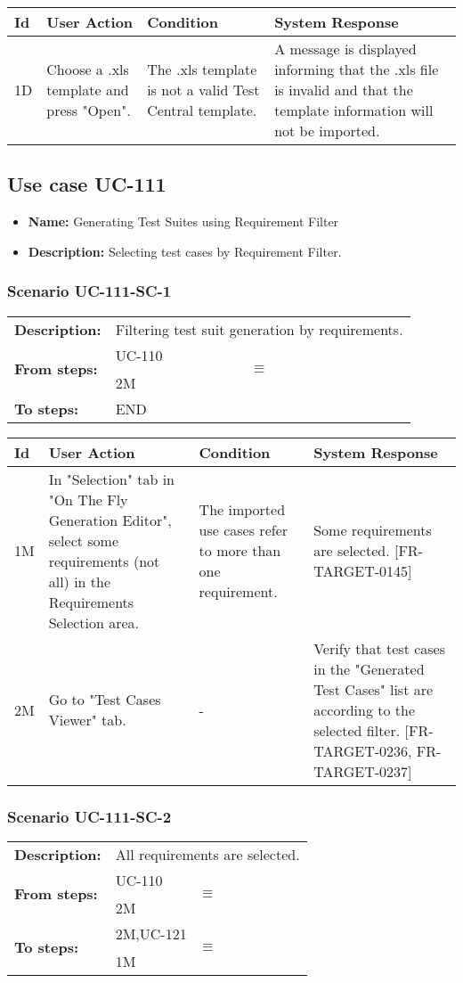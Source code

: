 \documentclass[a4paper,11pt]{article}
\newcommand{\bl}{\\ \hline}
\begin{document}
\begin{tabular}{|p{0.8in}|p{1.6in}|p{1.6in}|p{1.6in}|}
\hline
Id & User Action & Condition & System Response  \bl 
1D & Choose a .xls template and press "Open". & The .xls template is not a valid Test Central template. & A message is displayed informing that the .xls file is invalid and that the template information will not be imported. \bl 
\end{tabular}
\subsection*{Use case UC-111}
\begin{itemize}
\item {\bf Name: }Generating Test Suites using Requirement Filter
\item {\bf Description: }Selecting test cases by Requirement Filter.
\end{itemize}
\subsubsection*{Scenario UC-111-SC-1}
\begin{tabular}{p{1in}p{4in}}
{\bf Description:} & Filtering test suit generation by requirements. \\
{\bf From steps:} & UC-110$$\equiv$$2M \\
{\bf To steps:} & END \\
\end{tabular}
 
\begin{tabular}{|p{0.8in}|p{1.6in}|p{1.6in}|p{1.6in}|}
\hline
Id & User Action & Condition & System Response  \bl 
1M & In "Selection" tab in "On The Fly Generation Editor", select some requirements (not all) in the Requirements Selection area. & The imported use cases refer to more than one requirement. & Some requirements are selected. [FR-TARGET-0145] \bl 
2M & Go to "Test Cases Viewer" tab. & - & Verify that test cases in the "Generated Test Cases" list are according to the selected filter. [FR-TARGET-0236, FR-TARGET-0237] \bl 
\end{tabular}
\subsubsection*{Scenario UC-111-SC-2}
\begin{tabular}{p{1in}p{4in}}
{\bf Description:} & All requirements are selected. \\
{\bf From steps:} & UC-110$$\equiv$$2M \\
{\bf To steps:} & 2M,UC-121$$\equiv$$1M \\
\end{tabular}
 
\end{document}
